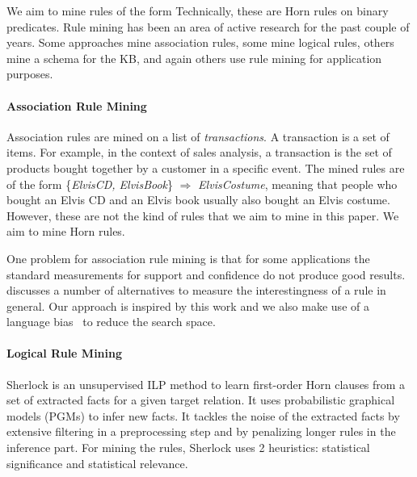 

\noindent We aim to mine rules of the form
Technically, these are Horn rules on binary predicates. Rule mining has been an area of active research for the past couple of years. 
Some approaches mine association rules, some mine logical rules, others mine a schema for the KB, and again others use rule mining for application purposes.


\paragraph{Association Rule Mining} Association rules \cite{AgrImiSwa93} are mined on a list of \emph{transactions}. A transaction is a set of items. 
For example, in the context of sales analysis, a transaction is the set of products bought together by a customer in a specific event. 
The mined rules are of the form \{\emph{ElvisCD, ElvisBook}\} $\Rightarrow$ \emph{ElvisCostume}, meaning that people who bought an Elvis CD and an Elvis book usually also bought an Elvis costume. 
However, these are not the kind of rules that we aim to mine in this paper. We aim to mine Horn rules.

One problem for association rule mining is that for some applications the standard measurements for support and confidence do not produce good results. 
\cite{TanKumSri02} discusses a number of alternatives to measure the interestingness of a rule in general. 
Our approach is inspired by this work and we also make use of a language bias~\cite{AdeRaeBru95} to reduce the search space. 


\paragraph{Logical Rule Mining}
Sherlock \cite{SchEtzWel10} is an unsupervised ILP method to learn first-order Horn clauses from a set of extracted facts for a given target relation. 
It uses probabilistic graphical models (PGMs) to infer new facts. 
It tackles the noise of the extracted  facts by extensive filtering in a preprocessing step and by penalizing longer rules in the inference part. 
For mining the rules, Sherlock uses 2 heuristics: statistical significance and statistical relevance.

